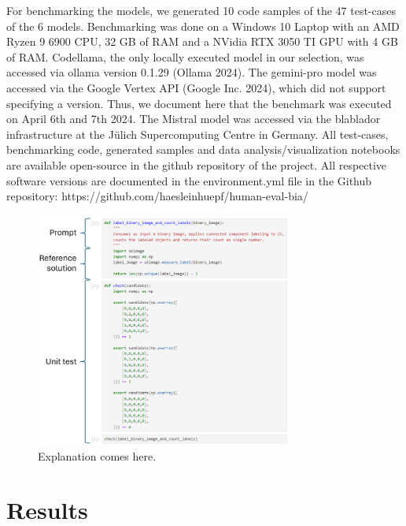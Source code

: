 \documentclass[doubleblind]{ecai}
\begin{document}
For benchmarking the models, we generated 10 code samples of the 47 test-cases of the 6 models. Benchmarking was done on a Windows 10 Laptop with an AMD Ryzen 9 6900 CPU, 32 GB of RAM and a NVidia RTX 3050 TI GPU with 4 GB of RAM. Codellama, the only locally executed model in our selection, was accessed via ollama version 0.1.29 (Ollama 2024). The gemini-pro model was accessed via the Google Vertex API (Google Inc. 2024), which did not support specifying a version. Thus, we document here that the benchmark was executed on April 6th and 7th 2024. The Mistral model was accessed via the blablador infrastructure at the Jülich Supercomputing Centre in Germany.
All test-cases, benchmarking code, generated samples and data analysis/visualization notebooks are available open-source in the github repository of the project. All respective software versions are documented  in the environment.yml file in the Github repository:
https://github.com/haesleinhuepf/human-eval-bia/ 

\begin{figure}[h]
\centering
\includegraphics[width=8.5cm]{example_test_case.png}
\caption{Explanation comes here.}
\label{fig:exampletestcase}
\end{figure}



\section{Results}
\end{document}
